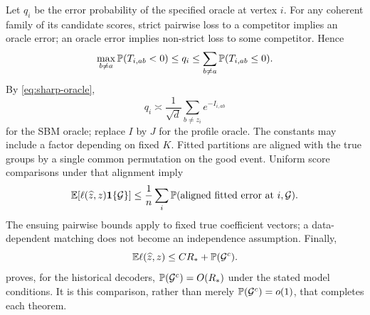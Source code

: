 Let $q_i$ be the error probability of the specified oracle at vertex $i$.
For any coherent family of its candidate scores, strict pairwise loss to a
competitor implies an oracle error; an oracle error implies non-strict
loss to some competitor. Hence
\[
 \max_{b\ne a}\mathbb P(T_{i,ab}<0)
 \le q_i\le\sum_{b\ne a}\mathbb P(T_{i,ab}\le0).
\]
By \eqref{eq:sharp-oracle},
\begin{equation}\label{eq:oracle-pairs}
 q_i\asymp\frac1{\sqrt d}\sum_{b\ne z_i}e^{-I_{i,ab}}
\end{equation}
for the SBM oracle; replace $I$ by $J$ for the profile oracle. The constants
may include a factor depending on fixed $K$.
Fitted partitions are aligned with the true groups by a single common
permutation on the good event. Uniform score comparisons under that
alignment imply
\[
 \mathbb E[\ell(\widehat z,z)\mathbf1\{\mathcal G\}]
 \le\frac1n\sum_i\mathbb P(\text{aligned fitted error at }i,\mathcal G).
\]
The ensuing pairwise bounds apply to fixed true coefficient vectors; a
data-dependent matching does not become an independence assumption.
Finally,
\begin{equation}\label{eq:bad-payment}
 \mathbb E\ell(\widehat z,z)
 \le C R_*+\mathbb P(\mathcal G^c).
\end{equation}
 proves, for the historical decoders, $\mathbb P(\mathcal G^c)=O(R_*)$ under the stated
model conditions. It is this comparison, rather than merely
$\mathbb P(\mathcal G^c)=o(1)$, that completes each theorem.

